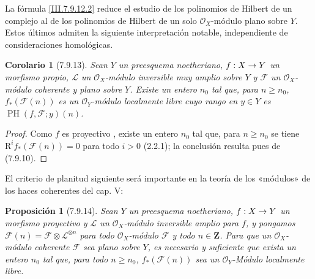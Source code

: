\documentclass[10pt,oneside,openany]{book}
\theoremstyle{egaenv}\newtheorem*{env}{---}
\theoremstyle{egastatement}
\newtheorem*{proposition}{Proposición}
\newtheorem*{corollary}{Corolario}
\theoremstyle{egadescription}
\newcommand{\oldpage}[2][]{\marginnote{\normalfont\scriptsize\textbf{#1}\,|\,#2}\ignorespaces}
\renewcommand{\geq}{\geqslant}
\renewcommand{\to}{\mathchoice{\longrightarrow}{\rightarrow}{\rightarrow}{\rightarrow}}
\begin{document}
La fórmula \eqref{III.7.9.12.2} reduce el estudio de los
polinomios de Hilbert de un complejo al de los polinomios de
Hilbert de un solo $\mathscr O_X$-módulo plano sobre $Y$.
Estos últimos admiten la siguiente interpretación notable,
independiente de consideraciones homológicas.

\begin{corollary}[7.9.13]
\label{III.7.9.13}
\label{III.7.9.13.fr}
Sean $Y$ un preesquema noetheriano, $f:X\to Y$ un morfismo propio,
$\mathscr L$ un $\mathscr O_X$-módulo inversible muy amplio sobre
$Y$ y $\mathscr F$ un $\mathscr O_X$-módulo coherente y plano
sobre $Y$. Existe un entero $n_0$ tal que, para $n\geq n_0$,
$f_*(\mathscr F(n))$ es un $\mathscr O_Y$-módulo localmente libre
cuyo rango en $y\in Y$ es
$\operatorname{PH}(f,\mathscr F;y)(n)$.
\end{corollary}

\begin{proof}
Como $f$ es proyectivo , existe un entero $n_0$
tal que, para $n\geq n_0$
\oldpage[III]{212}
se tiene $\mathrm R^if_*(\mathscr F(n))=0$ para todo $i>0$ (2.2.1); la conclusión
resulta pues de (7.9.10).
\end{proof}

El criterio de planitud siguiente será importante en la teoría de los «módulos»
de los haces coherentes del cap. V:

\begin{proposition}[7.9.14]
\label{III.7.9.14}
\label{III.7.9.14.fr}
Sean $Y$ un preesquema noetheriano, $f:X\to Y$ un morfismo
proyectivo y $\mathscr L$ un $\mathscr O_X$-módulo inversible
amplio para $f$, y pongamos
$\mathscr F(n)=\mathscr F\otimes\mathscr L^{\otimes n}$ para todo
$\mathscr O_X$-módulo $\mathscr F$ y
todo $n\in\mathbf Z$. Para que un
$\mathscr O_X$-módulo coherente $\mathscr F$ sea plano
sobre $Y$, es necesario y suficiente que exista un entero $n_0$
tal que, para todo $n\geq n_0$, $f_*(\mathscr F(n))$ sea un
$\mathscr O_Y$-Módulo localmente libre.
\end{proposition}
\end{document}
